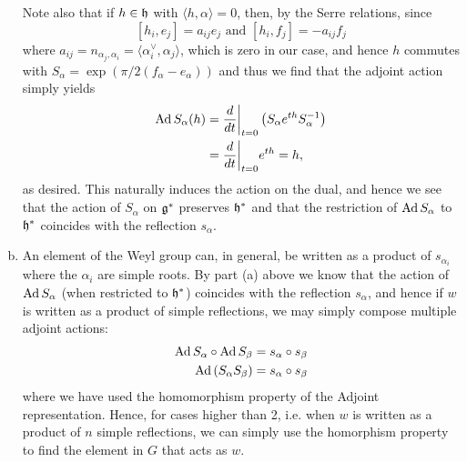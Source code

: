 \documentclass{../../mathnotes}
\begin{document}
\begin{enumerate}[(a)]
        Note also that if $h\in\mathfrak h$ with $\langle h,\alpha\rangle=0$, then, by the Serre relations, since
        \[ [h_i,e_j]=a_{ij}e_j\text{ and }[h_i,f_j]=-a_{ij}f_j  \]
        where $a_{ij}=n_{\alpha_j,\alpha_i}=\langle\alpha_i^\vee,\alpha_j\rangle$, which is zero in our case, and hence
        $h$ commutes with $S_\alpha=\exp(\pi/2(f_\alpha-e_\alpha))$ and thus we find that the adjoint action simply yields
        \begin{align*}
            \operatorname{Ad} S_\alpha(h)&=\frac{d}{dt}\bigg|_{t=0}\left( S_\alpha e^{th} S_\alpha^{-1}\right)\\
            &=\frac{d}{dt}\bigg|_{t=0} e^{th}=h,
        \end{align*}
        as desired. This naturally induces the action on the dual, and hence we see that the action of $S_\alpha$ on $\mathfrak g^*$ preserves
        $\mathfrak h^*$ and that the restriction of $\operatorname{Ad} S_\alpha$ to $\mathfrak h^*$ coincides with the reflection $s_\alpha$.

    \item An element of the Weyl group can, in general, be written as a product of $s_{\alpha_i}$ where the $\alpha_i$ are simple roots.
        By part (a) above we know that the action of $\operatorname{Ad} S_\alpha$ (when restricted to $\mathfrak h^*$) coincides with the reflection $s_\alpha$,
        and hence if $w$ is written as a product of simple reflections, we may simply compose multiple adjoint actions:
        \begin{align*}
            \operatorname{Ad} S_\alpha\circ\operatorname{Ad} S_\beta&=s_\alpha\circ s_\beta\\
            \operatorname{Ad}\left( S_\alpha S_\beta \right)&=s_\alpha\circ s_\beta
        \end{align*}
        where we have used the homomorphism property of the Adjoint representation. Hence, for cases higher than 2, i.e. when
        $w$ is written as a product of $n$ simple reflections, we can simply use the homorphism property to find the element
        in $G$ that acts as $w$.
\end{enumerate}
\end{document}

